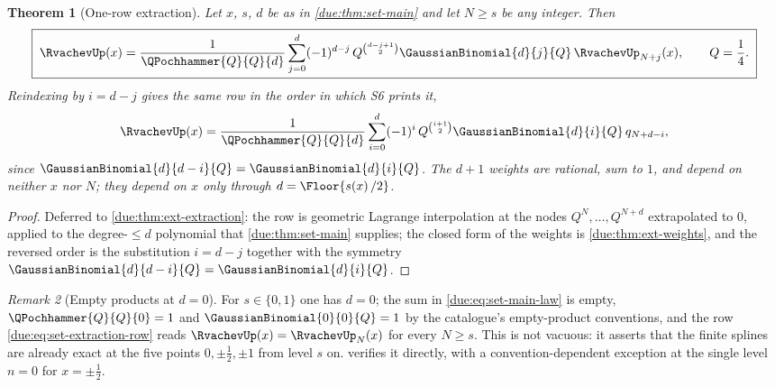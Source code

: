 \documentclass[11pt,oneside]{article}
\theoremstyle{plain}
\newtheorem{theorem}{Theorem}[section]
\theoremstyle{definition}
\theoremstyle{remark}
\newtheorem{remark}[theorem]{Remark}
\newcommand{\upn}[1]{\RvachevUp_{#1}}
\newcommand{\dep}[1]{s\!\left(#1\right)}                    %
\newcommand{\Qq}{Q}                                         %
\newcommand{\qn}[1]{q_{#1}}                                 %
\begin{document}
\begin{theorem}[One-row extraction]
\label{due:thm:set-extraction}
Let $x$, $s$, $d$ be as in \cref{due:thm:set-main} and let $N\ge s$ be any
integer.  Then
\begin{equation}
 \boxed{\;
 \RvachevUp(x)=\frac{1}{\QPochhammer{\Qq}{\Qq}{d}}
 \sum_{j=0}^{d}(-1)^{d-j}\,\Qq^{\binom{d-j+1}{2}}
 \GaussianBinomial{d}{j}{\Qq}\,\upn{N+j}(x),
 \qquad \Qq=\frac14 .\;}
 \label{due:eq:set-extraction-row}
\end{equation}
Reindexing by $i=d-j$ gives the same row in the order in which S6 prints
it,
\begin{equation}
 \RvachevUp(x)=\frac{1}{\QPochhammer{\Qq}{\Qq}{d}}
 \sum_{i=0}^{d}(-1)^{i}\,\Qq^{\binom{i+1}{2}}
 \GaussianBinomial{d}{i}{\Qq}\,\qn{N+d-i},
 \label{due:eq:set-extraction-row-reversed}
\end{equation}
since $\GaussianBinomial{d}{d-i}{\Qq}=\GaussianBinomial{d}{i}{\Qq}$.  The
$d+1$ weights are rational, sum to $1$, and depend on neither $x$ nor $N$;
they depend on $x$ only through $d=\Floor{\dep{x}/2}$.
\end{theorem}

\begin{proof}
Deferred to \cref{due:thm:ext-extraction}: the row is geometric Lagrange
interpolation at the nodes $\Qq^{N},\ldots,\Qq^{N+d}$ extrapolated to
$0$, applied to the degree-$\le d$ polynomial that \cref{due:thm:set-main}
supplies; the closed form of the weights is \cref{due:thm:ext-weights}, and
the reversed order is the substitution $i=d-j$ together with the symmetry
$\GaussianBinomial{d}{d-i}{\Qq}=\GaussianBinomial{d}{i}{\Qq}$.
\end{proof}

\begin{remark}[Empty products at $d=0$]
\label{due:rmk:set-d-zero}
For $s\in\{0,1\}$ one has $d=0$; the sum in \cref{due:eq:set-main-law} is
empty, $\QPochhammer{\Qq}{\Qq}{0}=1$ and
$\GaussianBinomial{0}{0}{\Qq}=1$ by the catalogue's empty-product
conventions, and the row \cref{due:eq:set-extraction-row} reads
$\RvachevUp(x)=\upn{N}(x)$ for every $N\ge s$.  This is not vacuous: it
asserts that the finite splines are already exact at the five points
$0,\pm\tfrac12,\pm1$ from level $s$ on.  
verifies it directly, with a convention-dependent exception at the single
level $n=0$ for $x=\pm\frac12$.
\end{remark}
\end{document}
